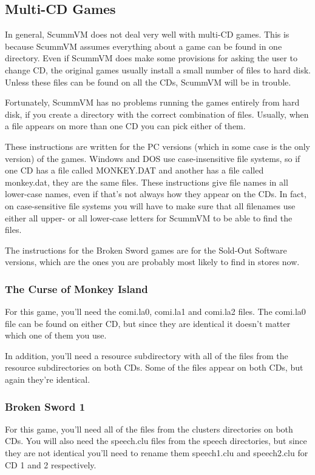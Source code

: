 
\subsection{Multi-CD Games}
In general, ScummVM does not deal very well with multi-CD games. This
is because ScummVM assumes everything about a game can be found in one
directory. Even if ScummVM does make some provisions for asking the
user to change CD, the original games usually install a small number
of files to hard disk. Unless these files can be found on all the CDs,
ScummVM will be in trouble.

Fortunately, ScummVM has no problems running the games entirely from
hard disk, if you create a directory with the correct combination of
files. Usually, when a file appears on more than one CD you can pick
either of them.

These instructions are written for the PC versions (which in some case
is the only version) of the games. Windows and DOS use
case-insensitive file systems, so if one CD has a file called
MONKEY.DAT and another has a file called monkey.dat, they are the same
files. These instructions give file names in all lower-case names,
even if that's not always how they appear on the CDs. In fact, on
case-sensitive file systems you will have to make sure that all
filenames use either all upper- or all lower-case letters for ScummVM
to be able to find the files.

The instructions for the Broken Sword games are for the Sold-Out
Software versions, which are the ones you are probably most likely to
find in stores now.


\subsubsection{The Curse of Monkey Island}
For this game, you'll need the comi.la0, comi.la1 and comi.la2 files.
The comi.la0 file can be found on either CD, but since they are
identical it doesn't matter which one of them you use.

In addition, you'll need a resource subdirectory with all of the files
from the resource subdirectories on both CDs. Some of the files appear
on both CDs, but again they're identical.

\subsubsection{Broken Sword 1}
For this game, you'll need all of the files from the clusters
directories on both CDs. You will also need the speech.clu files from
the speech directories, but since they are not identical you'll need
to rename them speech1.clu and speech2.clu for CD 1 and 2
respectively.

